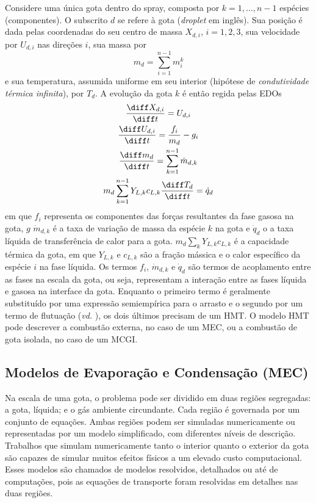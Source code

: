 Considere uma única gota dentro do spray, composta por $k=1,\ldots,n-1$ espécies (componentes).
O subscrito $d$ se refere à gota (\emph{droplet} em inglês).
Sua posição é dada pelas coordenadas do seu centro de massa $X_{d,i}$, $i=1,2,3$, sua velocidade por $U_{d,i}$ nas direções $i$, sua massa por 
\begin{equation}    
    m_d = \sum_{i=1}^{n-1} m_{i}^k
\end{equation}
e sua temperatura, assumida uniforme em seu interior (hipótese de \emph{condutividade térmica infinita}), por $T_d$.
A evolução da gota $k$ é então regida pelas EDOs \cite{JennyB2012}
\begin{gather}
    \frac{\diff X_{d,i}}{\diff t} = U_{d,i}
    \label{eq:Ud}\\
    \frac{\diff U_{d,i}}{\diff t} =
    \frac{f_i}{ m_{d}} -
    g_i 
    \label{eq:Xd} \\
    \frac{\diff m_{d}}{\diff t} = \sum_{k=1}^{n-1} \dot m_{d,k}
    \label{eq:md} \\
    m_d \sum_{k=1}^{n-1} Y_{L,k} c_{L,k} \frac{\diff T_d}{\diff t} = \dot q_d
    \label{eq:Td}
\end{gather}
em que $f_i$ representa os componentes das forças resultantes da fase gasosa na gota, $g$
$\dot m_{d,k}$ é a taxa de variação de massa da espécie $k$ na gota e $\dot q_d$ o a taxa líquida de transferência de calor para a gota.
$ m_d \sum_k Y_{L,k} c_{L,k}$ é a capacidade térmica da gota, em que 
$Y_{L,k}$ e $c_{L,k}$ são a fração mássica e o calor específico da  espécie $i$ na fase líquida.
Os termos $f_i$, $\dot m_{d,k}$ e $\dot q_d$ são termos de acoplamento entre as fases na escala da gota, ou seja, representam a interação entre as fases líquida e gasosa na interface da gota.
Enquanto o primeiro termo é geralmente substituído por uma expressão semiempírica para o arrasto e o segundo por um termo de flutuação (\emph{vd.} \cite[p. 16]{JennyB2012}), os dois últimos precisam de um HMT.
O modelo HMT pode descrever a combustão externa, no caso de um MEC, ou a combustão de gota isolada, no caso de um MCGI.  

\subsection{Modelos de Evaporação e Condensação (MEC)} \label{sec:MEC}

Na escala de uma gota, o problema pode ser dividido em duas regiões segregadas: a gota, líquida; e o gás ambiente circundante. 
Cada região é governada por um conjunto de equações.
Ambas regiões podem ser simuladas numericamente ou representadas por um modelo simplificado, com diferentes níveis de descrição.
Trabalhos que simulam numericamente tanto o interior quanto o exterior da gota são capazes de simular muitos efeitos físicos a um elevado custo computacional.
Esses modelos são chamados de modelos resolvidos, detalhados ou até de computações, pois as equações de transporte foram resolvidas em detalhes nas duas regiões.

